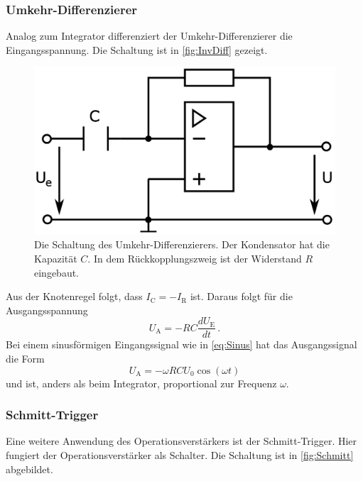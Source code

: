 \subsubsection{Umkehr-Differenzierer}
Analog zum Integrator differenziert der Umkehr-Differenzierer die Eingangsspannung. Die Schaltung ist in \autoref{fig:InvDiff} gezeigt.

\begin{figure}
    \centering
    \includegraphics[width=0.7\linewidth]{./figures/3_InvDiff.png}
    \caption{Die Schaltung des Umkehr-Differenzierers. Der Kondensator hat die Kapazität $C$. In dem Rückkopplungszweig ist der Widerstand $R$ eingebaut. \cite{V51}}
    \label{fig:InvDiff}
\end{figure}

Aus der Knotenregel folgt, dass $I_\text{C} = - I_\text{R}$ ist. Daraus folgt für die Ausgangsspannung
\begin{equation*}
    U_\text{A} = - R C \frac{d U_\text{E}}{dt} \, .
    \label{eq:Differenzierer}
\end{equation*}
Bei einem sinusförmigen Eingangssignal wie in \autoref{eq:Sinus} hat das Ausgangssignal die Form 
\begin{equation}
    U_\text{A} = - \omega R C U_0 \cos(\omega t)
    \label{eq:Diff_Kosinus}
\end{equation}
und ist, anders als beim Integrator, proportional zur Frequenz $\omega$.

\subsubsection{Schmitt-Trigger}
Eine weitere Anwendung des Operationsverstärkers ist der Schmitt-Trigger. Hier fungiert der Operationsverstärker als Schalter. Die Schaltung ist in \autoref{fig:Schmitt} abgebildet.

